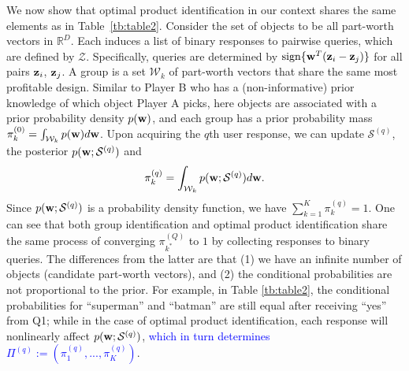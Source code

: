 \documentclass[onecolumn,11pt]{article}
\newcommand{\highlight}[1]{{\textcolor{blue}{{#1}}}}
\newcommand{\highlight}[1]{{{#1}}}
\newcommand{\cutsubsectionup}{\vspace*{-0.09in}}
\newcommand{\cutsubsectionup}{}
\begin{document}
We now show that optimal product identification in our context shares the same elements as in
Table~\ref{tb:table2}. Consider the set of objects to be all part-worth vectors in
$\mathbb{R}^D$. Each induces a list of binary responses to pairwise queries, which are defined by $\mathcal{Z}$. Specifically, queries are determined by $\text{sign}\{{\bf w}^T({\bf z}_i-{\bf z}_j)\}$ for all pairs ${\bf z}_i$, ${\bf z}_j$. A group is
a set $\mathcal{W}_k$ of part-worth vectors that share the same most profitable
design. Similar to Player B who has a (non-informative) prior knowledge of which object Player A picks, here objects are associated with a prior probability density $p({\bf w})$, and each group has a prior probability mass $\pi_k^{(0)} = \int_{\mathcal{W}_k} p({\bf w})d{\bf w}$. Upon acquiring the $q$th user response, we can update $\mathcal{S}^{(q)}$, the posterior $p({\bf w};\mathcal{S}^{(q)})$ and  
\begin{equation}
\pi_k^{(q)} = \int_{\mathcal{W}_k} p({\bf w};\mathcal{S}^{(q)})d{\bf w}.
\label{eq:pik}
\end{equation}
Since $p({\bf w};\mathcal{S}^{(q)})$ is a probability density function, we have $\sum_{k=1}^K\pi_k^{(q)}=1$. One can see that both group identification and optimal product identification share the same process of converging $\pi^{(Q)}_{k^*}$ to $1$ by collecting responses to binary queries. The differences from the latter are that (1) we have an infinite number of objects (candidate part-worth vectors), and (2) the conditional probabilities are not proportional to the prior. For example, in Table \ref{tb:table2}, the conditional probabilities for ``superman'' and ``batman'' are still equal after receiving ``yes'' from Q1; while in the case of optimal product identification, each response will nonlinearly affect $p({\bf w};\mathcal{S}^{(q)})$, \highlight{which in turn determines $\Pi^{(q)} := (\pi_1^{(q)},...,\pi_K^{(q)})$}.


\cutsubsectionup
\end{document}

